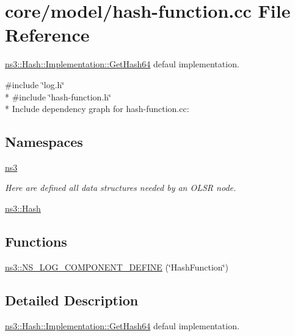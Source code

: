 \hypertarget{hash-function_8cc}{}\section{core/model/hash-\/function.cc File Reference}
\label{hash-function_8cc}


\hyperlink{classns3_1_1Hash_1_1Implementation_ae11335959394d22427d81abfa520106a}{ns3\+::\+Hash\+::\+Implementation\+::\+Get\+Hash64} defaul implementation.  


{\ttfamily \#include \char`\"{}log.\+h\char`\"{}}\\*
{\ttfamily \#include \char`\"{}hash-\/function.\+h\char`\"{}}\\*
Include dependency graph for hash-\/function.cc\+:
\subsection*{Namespaces}
\begin{DoxyCompactItemize}
\item 
 \hyperlink{namespacens3}{ns3}
\begin{DoxyCompactList}\small\item\em Here are defined all data structures needed by an O\+L\+SR node. \end{DoxyCompactList}\item 
 \hyperlink{namespacens3_1_1Hash}{ns3\+::\+Hash}
\end{DoxyCompactItemize}
\subsection*{Functions}
\begin{DoxyCompactItemize}
\item 
\hyperlink{namespacens3_a4fab46fe31e3017467fd1c042e513913}{ns3\+::\+N\+S\+\_\+\+L\+O\+G\+\_\+\+C\+O\+M\+P\+O\+N\+E\+N\+T\+\_\+\+D\+E\+F\+I\+NE} (\char`\"{}Hash\+Function\char`\"{})
\end{DoxyCompactItemize}


\subsection{Detailed Description}
\hyperlink{classns3_1_1Hash_1_1Implementation_ae11335959394d22427d81abfa520106a}{ns3\+::\+Hash\+::\+Implementation\+::\+Get\+Hash64} defaul implementation. 

